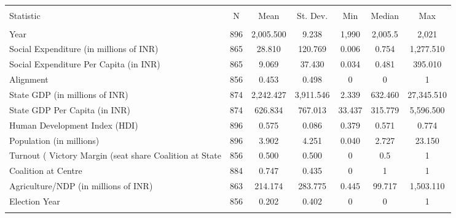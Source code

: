 
\begin{table}[!htbp] \centering 
  \caption{} 
  \label{} 
\begin{tabular}{@{\extracolsep{5pt}}lcccccc} 
\\[-1.8ex]\hline 
\hline \\[-1.8ex] 
Statistic & \multicolumn{1}{c}{N} & \multicolumn{1}{c}{Mean} & \multicolumn{1}{c}{St. Dev.} & \multicolumn{1}{c}{Min} & \multicolumn{1}{c}{Median} & \multicolumn{1}{c}{Max} \\ 
\hline \\[-1.8ex] 
Year & 896 & 2,005.500 & 9.238 & 1,990 & 2,005.5 & 2,021 \\ 
Social Expenditure (in millions of INR) & 865 & 28.810 & 120.769 & 0.006 & 0.754 & 1,277.510 \\ 
Social Expenditure Per Capita (in INR) & 865 & 9.069 & 37.430 & 0.034 & 0.481 & 395.010 \\ 
Alignment & 856 & 0.453 & 0.498 & 0 & 0 & 1 \\ 
State GDP (in millions of INR) & 874 & 2,242.427 & 3,911.546 & 2.339 & 632.460 & 27,345.510 \\ 
State GDP Per Capita (in INR) & 874 & 626.834 & 767.013 & 33.437 & 315.779 & 5,596.500 \\ 
Human Development Index (HDI) & 896 & 0.575 & 0.086 & 0.379 & 0.571 & 0.774 \\ 
Population (in millions) & 896 & 3.902 & 4.251 & 0.040 & 2.727 & 23.150 \\ 
Turnout (%
Victory Margin (seat share %
Coalition at State & 856 & 0.500 & 0.500 & 0 & 0.5 & 1 \\ 
Coalition at Centre & 884 & 0.747 & 0.435 & 0 & 1 & 1 \\ 
Agriculture/NDP (in millions of INR) & 863 & 214.174 & 283.775 & 0.445 & 99.717 & 1,503.110 \\ 
Election Year & 856 & 0.202 & 0.402 & 0 & 0 & 1 \\ 
\hline \\[-1.8ex] 
\end{tabular} 
\end{table} 
